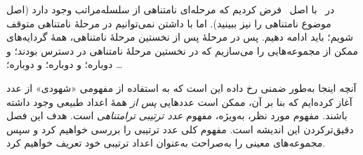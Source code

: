 \documentclass[../../../include/open-logic-section]{subfiles}
\begin{document}


در~ با اصل~\stagesinf{} فرض کردیم که مرحله‌ای نامتناهی
از سلسله‌مراتب وجود دارد (اصل موضوع نامتناهی را نیز ببینید). اما با داشتن
\stagessucc{} نمی‌توانیم در مرحلهٔ نامتناهی متوقف شویم؛ باید ادامه دهیم.
پس در مرحلهٔ پس از نخستین مرحلهٔ نامتناهی، همهٔ گردایه‌های ممکن از
مجموعه‌هایی را می‌سازیم که در نخستین مرحلهٔ نامتناهی در دسترس بودند؛ و
دوباره؛ و دوباره؛ و دوباره؛ \dots

آنچه اینجا به‌طور ضمنی رخ داده این است که به استفاده از مفهومی «شهودی» از
عدد آغاز کرده‌ایم که بنا بر آن، ممکن است عددهایی \emph{پس از} همهٔ اعداد
طبیعی وجود داشته باشند. مفهوم مورد نظر، به‌ویژه، مفهوم \emph{عدد ترتیبی
ترامتناهی} است. هدف این فصل دقیق‌ترکردن این اندیشه است. مفهوم کلی عدد
ترتیبی را بررسی خواهیم کرد و سپس مجموعه‌های معینی را به‌صراحت به‌عنوان
اعداد ترتیبی خود تعریف خواهیم کرد.
\end{document}
